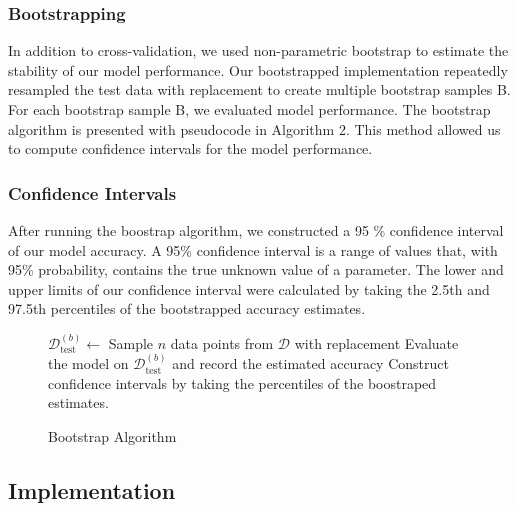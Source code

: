 \subsubsection{Bootstrapping}

In addition to cross-validation, we used non-parametric bootstrap to estimate the stability of our model performance. Our bootstrapped implementation repeatedly resampled the test data with replacement to create multiple bootstrap samples B. For each bootstrap sample B, we evaluated model performance. The bootstrap algorithm is presented with pseudocode in Algorithm 2. This method allowed us to compute confidence intervals for the model performance.
\cite{hastie2009elements}

\subsubsection{Confidence Intervals}
After running the boostrap algorithm, we constructed a 95 \% confidence interval of our model accuracy. A 95\% confidence interval is a range of values that, with 95\% probability, contains the true unknown value of a parameter\cite{james2013introduction}. The lower and upper limits of our confidence interval were calculated by taking the 2.5th and 97.5th percentiles of the bootstrapped accuracy estimates.

\begin{figure}[H]
    \begin{algorithm}[H]
    \caption{Bootstrap Algorithm}
    \label{algo:bootstrap}
        \begin{algorithmic}[1]
                \State $\mathcal{D}^{(b)}_{\text{test}} \gets$ Sample $n$ data points from $\mathcal{D}$ with replacement
                \State Evaluate the model on $\mathcal{D}^{(b)}_{\text{test}}$ and record the estimated accuracy
            \EndFor
            \State Construct confidence intervals by taking the percentiles of the boostraped estimates.
            \EndProcedure
        \end{algorithmic}
    \end{algorithm}
\end{figure}

\subsection{Implementation}
